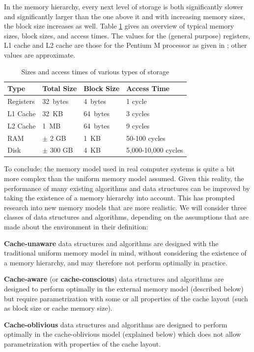 \documentclass{acm_proc_article-sp}
\begin{document}
In the memory hierarchy, every next level of storage is both significantly slower and significantly larger than the one above it and with increasing memory sizes, the block size increases as well. Table \ref{tab-memhier} gives an overview of typical memory sizes, block sizes, and access times. The values for the (general purpose) registers, L1 cache and L2 cache are those for the Pentium M processor as given in \cite{intel-opt}; other values are approximate.

\begin{table}
\begin{center}
\begin{tabular}{ l l l l }
\hline
\textbf{Type} & \textbf{Total Size} & \textbf{Block Size} & \textbf{Access Time} \\
\hline
Registers  &   32~bytes & 4~bytes & 1 cycle \\
L1 Cache   &   32~KB    & 64~bytes & 3 cycles \\
L2 Cache   &    1~MB    & 64~bytes & 9 cycles \\
RAM        &  $\pm$ 2 GB    & 1~KB     & 50-100 cycles \\
Disk       &  $\pm$ 300 GB    & 4~KB     & 5,000-10,000 cycles \\
\hline
\end{tabular}
\caption{Sizes and access times of various types of storage}
\label{tab-memhier}
\end{center}
\end{table}

To conclude: the memory model used in real computer systems is quite a bit more complex than the uniform memory model assumed. Given this reality, the performance of many existing algorithms and data structures can be improved by taking the existence of a memory hierarchy into account. This has prompted research into new memory models that are more realistic. We will consider three classes of data structures and algorithms, depending on the assumptions that are made about the environment in their definition:
\begin{list}{}{}
\item \textbf{Cache-unaware} data structures and algorithms are designed with the traditional uniform memory model in mind, without considering the existence of a memory hierarchy, and may therefore not perform optimally in practice.
\item \textbf{Cache-aware} (or \textbf{cache-conscious}) data structures and algorithms are designed to perform optimally in the external memory model (described below) but require parametrization with some or all properties of the cache layout (such as block size or cache memory size).
\item \textbf{Cache-oblivious} data structures and algorithms are designed to perform optimally in the cache-oblivious model (explained below) which does not allow para\-metri\-zation with properties of the cache layout.
\end{list}
\end{document}
